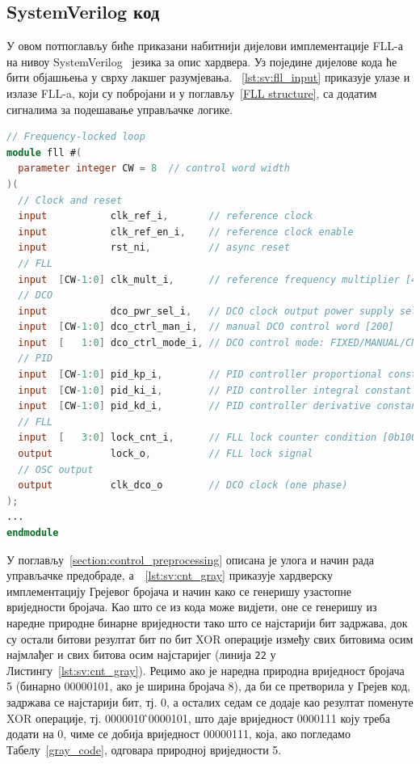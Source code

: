 \documentclass[master]{finthesis}
\newcommand*{\prog}[1]{\texttt{#1}}
\def \FLL  {FLL} %
\begin{document}
\subsection{SystemVerilog код} \label{section:impl:systemVerilog}
У овом потпоглављу биће приказани набитнији дијелови имплементације \FLL-а на нивоу SystemVerilog~\cite{SystemVerilog:1800-2023} језика за опис хардвера. Уз поједине дијелове кода ће бити објашњења у сврху лакшег разумјевања. \lstlistingname~\ref{lst:sv:fll_input} приказује улазе и излазе \FLL-a, који су побројани и у поглављу~\ref{FLL structure}, са додатим сигналима за подешавање управљачке логике. \par 
\begin{lstlisting}[language=Verilog, caption={Улазни и излазни сигнали хијерархијски највишег \FLL\ модула.}, label={lst:sv:fll_input}]
 // Frequency-locked loop
module fll #(
  parameter integer CW = 8  // control word width
)(
  // Clock and reset
  input           clk_ref_i,       // reference clock
  input           clk_ref_en_i,    // reference clock enable
  input           rst_ni,          // async reset
  // FLL
  input  [CW-1:0] clk_mult_i,      // reference frequency multiplier [40]
  // DCO
  input           dco_pwr_sel_i,   // DCO clock output power supply selection: VDDL/VDD [0/1]
  input  [CW-1:0] dco_ctrl_man_i,  // manual DCO control word [200]
  input  [   1:0] dco_ctrl_mode_i, // DCO control mode: FIXED/MANUAL/CNT/PID [3/2]
  // PID
  input  [CW-1:0] pid_kp_i,        // PID controller proportional constant [0b01000000]
  input  [CW-1:0] pid_ki_i,        // PID controller integral constant [0b01000000]
  input  [CW-1:0] pid_kd_i,        // PID controller derivative constant [0]
  // FLL
  input  [   3:0] lock_cnt_i,      // FLL lock counter condition [0b1000]
  output          lock_o,          // FLL lock signal
  // OSC output
  output          clk_dco_o        // DCO clock (one phase)
);
...
endmodule
\end{lstlisting}
У поглављу~\ref{section:control_preprocessing} описана је улога и начин рада управљачке предобраде, а~\lstlistingname~\ref{lst:sv:cnt_gray} приказује хардверску имплементацију Грејевог бројача и начин како се генеришу узастопне вриједности бројача. Као што се из кода може видјети, оне се генеришу из наредне природне бинарне вриједности тако што се најстарији бит задржава, док су остали битови резултат бит по бит XOR операције између свих битовима осим најмлађег и свих битова осим најстаријег (линија \prog{22} у Листингу~\ref{lst:sv:cnt_gray}). Рецимо ако је наредна природна вриједност бројача 5 (бинарно 00000101, ако је ширина бројача 8), да би се претворила у Грејев код, задржава се најстарији бит, тј. 0, а осталих седам се додаје као резултат поменуте XOR операције, тј. 0000010\,\^\,0000101, што даје вриједност 0000111 коју треба додати на 0, чиме се добија вриједност 00000111, која, ако погледамо Табелу~\ref{gray_code}, одговара природној вриједности 5. \par
\end{document}
